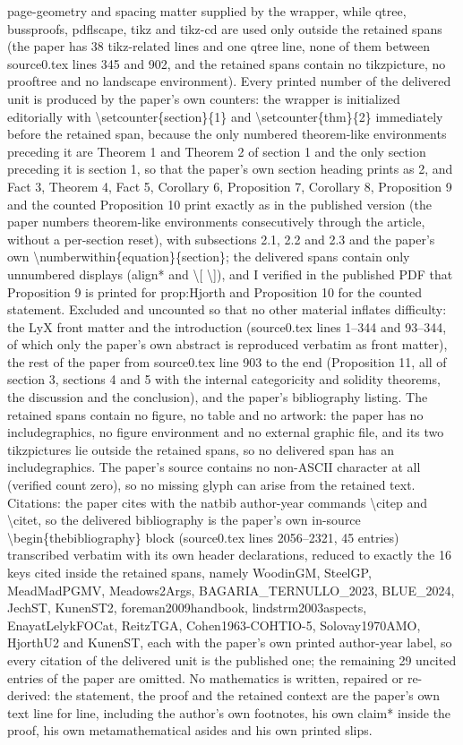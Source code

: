 \documentclass[10pt,a4paper]{amsart}
\numberwithin{equation}{section}
\numberwithin{figure}{section}
\theoremstyle{plain}
\theoremstyle{plain}
\theoremstyle{plain}
\theoremstyle{plain}
\theoremstyle{remark}
\theoremstyle{plain}
\theoremstyle{definition}
\begin{document}
page-geometry and spacing matter supplied by the wrapper, while qtree, bussproofs, pdflscape, tikz and tikz-cd are used only outside the retained spans (the paper has 38 tikz-related lines and one qtree line, none of them between source0.tex lines 345 and 902, and the retained spans contain no tikzpicture, no prooftree and no landscape environment). Every printed number of the delivered unit is produced by the paper's own counters: the wrapper is initialized editorially with \textbackslash{}setcounter\{section\}\{1\} and \textbackslash{}setcounter\{thm\}\{2\} immediately before the retained span, because the only numbered theorem-like environments preceding it are Theorem 1 and Theorem 2 of section 1 and the only section preceding it is section 1, so that the paper's own section heading prints as 2, and Fact 3, Theorem 4, Fact 5, Corollary 6, Proposition 7, Corollary 8, Proposition 9 and the counted Proposition 10 print exactly as in the published version (the paper numbers theorem-like environments consecutively through the article, without a per-section reset), with subsections 2.1, 2.2 and 2.3 and the paper's own \textbackslash{}numberwithin\{equation\}\{section\}; the delivered spans contain only unnumbered displays (align* and \textbackslash{}[ \textbackslash{}]), and I verified in the published PDF that Proposition 9 is printed for prop:Hjorth and Proposition 10 for the counted statement. Excluded and uncounted so that no other material inflates difficulty: the LyX front matter and the introduction (source0.tex lines 1--344 and 93--344, of which only the paper's own abstract is reproduced verbatim as front matter), the rest of the paper from source0.tex line 903 to the end (Proposition 11, all of section 3, sections 4 and 5 with the internal categoricity and solidity theorems, the discussion and the conclusion), and the paper's bibliography listing. The retained spans contain no figure, no table and no artwork: the paper has no includegraphics, no figure environment and no external graphic file, and its two tikzpictures lie outside the retained spans, so no delivered span has an includegraphics. The paper's source contains no non-ASCII character at all (verified count zero), so no missing glyph can arise from the retained text. Citations: the paper cites with the natbib author-year commands \textbackslash{}citep and \textbackslash{}citet, so the delivered bibliography is the paper's own in-source \textbackslash{}begin\{thebibliography\} block (source0.tex lines 2056--2321, 45 entries) transcribed verbatim with its own header declarations, reduced to exactly the 16 keys cited inside the retained spans, namely WoodinGM, SteelGP, MeadMadPGMV, Meadows2Args, BAGARIA\_TERNULLO\_2023, BLUE\_2024, JechST, KunenST2, foreman2009handbook, lindstrm2003aspects, EnayatLelykFOCat, ReitzTGA, Cohen1963-COHTIO-5, Solovay1970AMO, HjorthU2 and KunenST, each with the paper's own printed author-year label, so every citation of the delivered unit is the published one; the remaining 29 uncited entries of the paper are omitted. No mathematics is written, repaired or re-derived: the statement, the proof and the retained context are the paper's own text line for line, including the author's own footnotes, his own claim* inside the proof, his own metamathematical asides and his own printed slips.
\setcounter{section}{1}
\setcounter{thm}{2}
\end{document}
